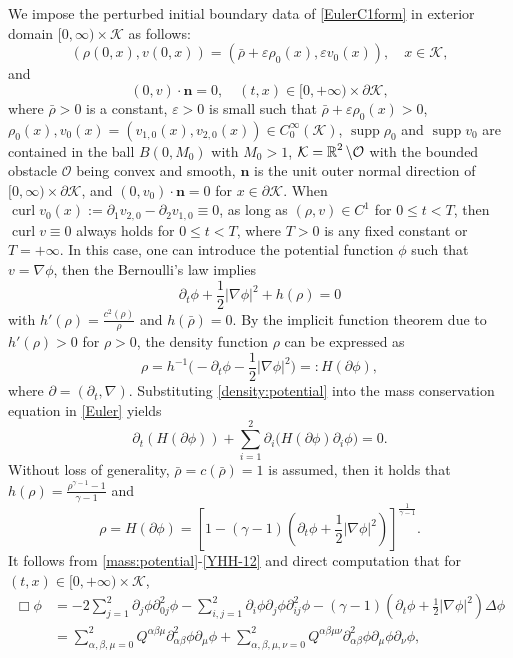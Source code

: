 \documentclass[11pt,twoside]{article}
\def\cK{\mathcal K}
\def\cO{\mathcal O}
\def\na{\nabla}
\def\R{\mathop{\mathbb R\kern 0pt}\nolimits}
\def\ds{\displaystyle}
\def\f{\frac}
\def\supp{\mathop{\rm supp}\nolimits}
\def\p{\partial}
\def\ve{\varepsilon}
\def\curl{\operatorname{curl}}
\def\supp{\operatorname{supp}}
\def\bn{\mathbf{n}}
\theoremstyle{plain}
\theoremstyle{definition}
\numberwithin{equation}{section}
\begin{document}
We impose the perturbed initial boundary data of \eqref{EulerC1form} in exterior domain $[0,\infty)\times \cK$ as follows:
\begin{equation}\label{initial}
(\rho(0,x), v(0,x))=(\bar\rho+\ve\rho_0(x), \ve v_0(x)),\quad x\in\cK,
\end{equation}
and
\begin{equation}\label{YinA-110}
(0,v)\cdot\bn=0, \quad (t,x)\in[0,+\infty)\times\p\cK,
\end{equation}
where $\bar\rho>0$ is a constant, $\ve>0$ is small such that $\bar\rho+\ve\rho_0(x)>0$,
$\rho_0(x), v_0(x)=(v_{1,0}(x), v_{2,0}(x))\in C_0^{\infty}(\cK)$,
$\supp \rho_0$ and $\supp v_0$ are contained in the ball $B(0, M_0)$ with $M_0>1$,
$\cK=\R^2\setminus\cO$ with
the bounded obstacle $\cO$ being convex and smooth, $\bn$ is the unit outer normal direction of $[0,\infty)\times\p\cK$,
and $(0,v_0)\cdot\bn=0$ for $x\in\p\cK$.  When $\curl v_0(x):=\p_1 v_{2,0}-\p_2 v_{1,0}\equiv 0$,
as long as $(\rho, v)\in C^1$ for $0\le t<T$, then $\curl v\equiv 0$
always holds for $0\le t<T$, where $T>0$ is any fixed constant or $T=+\infty$. In this case, one can introduce
the potential function $\phi$ such that $v=\na \phi$,
then the Bernoulli's law implies 
\begin{equation}\label{Feng-1}
\p_t\phi+\f12|\na\phi|^2+h(\rho)=0
\end{equation}
with $h'(\rho)=\f{c^2(\rho)}{\rho}$ and $h(\bar\rho)=0$.
By the implicit function theorem due to
$h'(\rho)>0$ for $\rho>0$, the density
function $\rho$ can be expressed as
\begin{equation}\label{density:potential}
\rho=h^{-1}\big(-\p_t\phi-\frac{1}{2}|\na\phi|^2\big)
=:H(\p\phi),
\end{equation}
where $\p=(\p_t,\nabla).$ Substituting \eqref{density:potential} into the mass conservation equation in \eqref{Euler}
yields
\begin{equation}\label{mass:potential}
\p_t(H(\p\phi))+\ds\sum_{i=1}^2\p_i\bigl(H(\p\phi)\p_i\phi\bigr)=0.
\end{equation}
Without loss of generality, $\bar\rho=c(\bar\rho)=1$ is assumed,  then it holds that $h(\rho)=\f{\rho^{\gamma-1}-1}{\gamma-1}$ and
\begin{equation}\label{YHH-12}
\rho=H(\p\phi)=[1-(\gamma-1)(\p_t\phi+\f12|\na\phi|^2)]^{\f{1}{\gamma-1}}.
\end{equation}
It follows from \eqref{mass:potential}-\eqref{YHH-12}  and  direct computation that for $(t,x)\in[0,+\infty)\times\cK$,
\begin{equation}\label{eqn:potential}
\begin{split}
\Box\phi&=-2\sum_{j=1}^2\p_j\phi\p^2_{0j}\phi-\sum_{i,j=1}^2\p_i\phi\p_j\phi\p^2_{ij}\phi
-(\gamma-1)(\p_t\phi+\frac12|\nabla\phi|^2)\Delta\phi\\
&=\sum_{\alpha,\beta,\mu=0}^2Q^{\alpha\beta\mu}\p^2_{\alpha\beta}\phi\p_{\mu}\phi
+\sum_{\alpha,\beta,\mu,\nu=0}^2Q^{\alpha\beta\mu\nu}\p^2_{\alpha\beta}\phi\p_{\mu}\phi\p_{\nu}\phi,
\end{split}
\end{equation}
\end{document}
